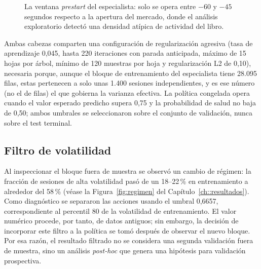 \begin{figure}[h]
\centering
{}
\caption{La ventana \emph{prestart} del especialista: solo se opera entre $-60$ y $-45$
segundos respecto a la apertura del mercado, donde el análisis exploratorio detectó una
densidad atípica de actividad del libro.}
\label{fig:prestart}
\end{figure}

Ambas cabezas comparten una
configuración de regularización agresiva (tasa de aprendizaje 0,045, hasta 220 iteraciones
con parada anticipada, máximo de 15 hojas por árbol, mínimo de 120 muestras por hoja y
regularización L2 de 0,10), necesaria porque, aunque el bloque de entrenamiento del especialista
tiene 28.095 filas, estas pertenecen a solo unas 1.400 sesiones independientes, y es ese
número (no el de filas) el que gobierna la varianza efectiva. La política congelada opera cuando el valor
esperado predicho supera 0,75 y la probabilidad de salud no baja de 0,50; ambos umbrales se
seleccionaron sobre el conjunto de validación, nunca sobre el test terminal.

\subsection{Filtro de volatilidad}

Al inspeccionar el bloque fuera de muestra se observó un cambio de régimen: la fracción de
sesiones de alta volatilidad pasó de un 18--22\,\% en entrenamiento a alrededor del 58\,\%
(véase la Figura~\ref{fig:regimen} del Capítulo~\ref{ch::resultados}). Como diagnóstico se
separaron las acciones usando el umbral 0,6657, correspondiente al percentil 80 de la
volatilidad de entrenamiento. El valor numérico procede, por tanto, de datos antiguos; sin
embargo, la decisión de incorporar este filtro a la política se tomó después de observar el
nuevo bloque. Por esa razón, el resultado filtrado no se considera una segunda validación
fuera de muestra, sino un análisis \emph{post-hoc} que genera una hipótesis para validación
prospectiva.

